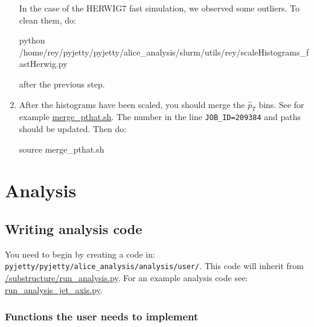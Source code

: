 \documentclass[12pt]{article}
\begin{document}
\begin{enumerate}
In the case of the HERWIG7 fast simulation, we observed some outliers. To clean them, do:

\begin{tcolorbox}
\begin{verbnobox}[\scriptsize]
python /home/rey/pyjetty/pyjetty/alice_analysis/slurm/utils/rey/scaleHistograms_fastHerwig.py
\end{verbnobox}  
\end{tcolorbox}

after the previous step.

\item After the histograms have been scaled, you should merge the $\hat{p}_T$ bins. See for example \href{https://github.com/reynier0611/pyjetty/blob/master/pyjetty/alice_analysis/slurm/utils/rey/merge_pthat.sh}{merge\_pthat.sh}.
The number in the line \verb|JOB_ID=209384| and paths should be updated. Then do:

\begin{tcolorbox}
\begin{verbnobox}[\scriptsize]
source merge_pthat.sh
\end{verbnobox}  
\end{tcolorbox}

\end{enumerate}

\section{Analysis}

\subsection{Writing analysis code}

You need to begin by creating a code in: \verb|pyjetty/pyjetty/alice_analysis/analysis/user/|.
This code will inherit from
\href{https://github.com/reynier0611/pyjetty/blob/master/pyjetty/alice_analysis/analysis/user/substructure/run_analysis.py}{/substructure/run\_analysis.py}.
For an example analysis code see: \href{https://github.com/reynier0611/pyjetty/blob/master/pyjetty/alice_analysis/analysis/user/rey/run_analysis_jet_axis.py}{run\_analysis\_jet\_axis.py}.

\subsubsection{Functions the user needs to implement}
\end{document}

